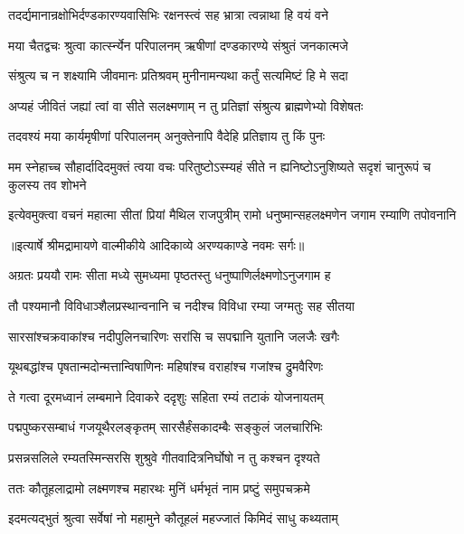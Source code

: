 \twolineshloka
{तदर्द्यमानान्रक्षोभिर्दण्डकारण्यवासिभिः}
{रक्षनस्त्वं सह भ्रात्रा त्वन्नाथा हि वयं वने} %

\twolineshloka
{मया चैतद्वचः श्रुत्वा कार्त्स्न्येन परिपालनम्}
{ऋषीणां दण्डकारण्ये संश्रुतं जनकात्मजे} %

\twolineshloka
{संश्रुत्य च न शक्ष्यामि जीवमानः प्रतिश्रवम्}
{मुनीनामन्यथा कर्तुं सत्यमिष्टं हि मे सदा} %

\twolineshloka
{अप्यहं जीवितं जह्यां त्वां वा सीते सलक्ष्मणाम्}
{न तु प्रतिज्ञां संश्रुत्य ब्राह्मणेभ्यो विशेषतः} %

\twolineshloka
{तदवश्यं मया कार्यमृषीणां परिपालनम्}
{अनुक्तेनापि वैदेहि प्रतिज्ञाय तु किं पुनः} %

\threelineshloka
{मम स्नेहाच्च सौहार्दादिदमुक्तं त्वया वचः}
{परितुष्टोऽस्म्यहं सीते न ह्यनिष्टोऽनुशिष्यते}
{सदृशं चानुरूपं च कुलस्य तव शोभने} %

\fourlineindentedshloka
{इत्येवमुक्त्वा वचनं महात्मा}
{सीतां प्रियां मैथिल राजपुत्रीम्}
{रामो धनुष्मान्सहलक्ष्मणेन}
{जगाम रम्याणि तपोवनानि} %


{॥इत्यार्षे श्रीमद्रामायणे वाल्मीकीये आदिकाव्ये अरण्यकाण्डे नवमः सर्गः॥}


\twolineshloka
{अग्रतः प्रययौ रामः सीता मध्ये सुमध्यमा}
{पृष्ठतस्तु धनुष्पाणिर्लक्ष्मणोऽनुजगाम ह} %

\twolineshloka
{तौ पश्यमानौ विविधाञ्शैलप्रस्थान्वनानि च}
{नदीश्च विविधा रम्या जग्मतुः सह सीतया} %

\twolineshloka
{सारसांश्चक्रवाकांश्च नदीपुलिनचारिणः}
{सरांसि च सपद्मानि युतानि जलजैः खगैः} %

\twolineshloka
{यूथबद्धांश्च पृषतान्मदोन्मत्तान्विषाणिनः}
{महिषांश्च वराहांश्च गजांश्च द्रुमवैरिणः} %

\twolineshloka
{ते गत्वा दूरमध्वानं लम्बमाने दिवाकरे}
{ददृशुः सहिता रम्यं तटाकं योजनायतम्} %

\twolineshloka
{पद्मपुष्करसम्बाधं गजयूथैरलङ्कृतम्}
{सारसैर्हंसकादम्बैः सङ्कुलं जलचारिभिः} %

\twolineshloka
{प्रसन्नसलिले रम्यतस्मिन्सरसि शुश्रुवे}
{गीतवादित्रनिर्घोषो न तु कश्चन दृश्यते} %

\twolineshloka
{ततः कौतूहलाद्रामो लक्ष्मणश्च महारथः}
{मुनिं धर्मभृतं नाम प्रष्टुं समुपचक्रमे} %

\twolineshloka
{इदमत्यद्भुतं श्रुत्वा सर्वेषां नो महामुने}
{कौतूहलं महज्जातं किमिदं साधु कथ्यताम्} %

